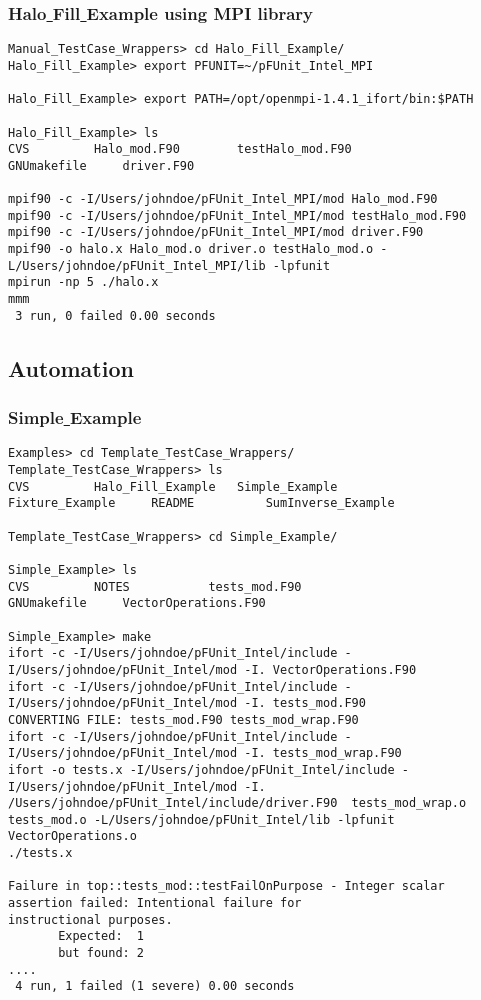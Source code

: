 \documentclass[10pt]{article}
\begin{document}
\subsubsection{Halo\underline{ }Fill\underline{ }Example using MPI library}

{\small \begin{verbatim}
Manual_TestCase_Wrappers> cd Halo_Fill_Example/
Halo_Fill_Example> export PFUNIT=~/pFUnit_Intel_MPI

Halo_Fill_Example> export PATH=/opt/openmpi-1.4.1_ifort/bin:$PATH

Halo_Fill_Example> ls
CVS			Halo_mod.F90		testHalo_mod.F90
GNUmakefile		driver.F90

mpif90 -c -I/Users/johndoe/pFUnit_Intel_MPI/mod Halo_mod.F90
mpif90 -c -I/Users/johndoe/pFUnit_Intel_MPI/mod testHalo_mod.F90
mpif90 -c -I/Users/johndoe/pFUnit_Intel_MPI/mod driver.F90
mpif90 -o halo.x Halo_mod.o driver.o testHalo_mod.o -L/Users/johndoe/pFUnit_Intel_MPI/lib -lpfunit
mpirun -np 5 ./halo.x
mmm  
 3 run, 0 failed 0.00 seconds

\end{verbatim}
}

\subsection{Automation}

\subsubsection{Simple\underline{ }Example}

{\small \begin{verbatim}
Examples> cd Template_TestCase_Wrappers/
Template_TestCase_Wrappers> ls
CVS			Halo_Fill_Example	Simple_Example
Fixture_Example		README			SumInverse_Example

Template_TestCase_Wrappers> cd Simple_Example/

Simple_Example> ls
CVS			NOTES			tests_mod.F90
GNUmakefile		VectorOperations.F90

Simple_Example> make
ifort -c -I/Users/johndoe/pFUnit_Intel/include -I/Users/johndoe/pFUnit_Intel/mod -I. VectorOperations.F90
ifort -c -I/Users/johndoe/pFUnit_Intel/include -I/Users/johndoe/pFUnit_Intel/mod -I. tests_mod.F90
CONVERTING FILE: tests_mod.F90 tests_mod_wrap.F90
ifort -c -I/Users/johndoe/pFUnit_Intel/include -I/Users/johndoe/pFUnit_Intel/mod -I. tests_mod_wrap.F90
ifort -o tests.x -I/Users/johndoe/pFUnit_Intel/include -I/Users/johndoe/pFUnit_Intel/mod -I. /Users/johndoe/pFUnit_Intel/include/driver.F90  tests_mod_wrap.o  tests_mod.o -L/Users/johndoe/pFUnit_Intel/lib -lpfunit VectorOperations.o
./tests.x     
  
Failure in top::tests_mod::testFailOnPurpose - Integer scalar assertion failed: Intentional failure for 
instructional purposes.
       Expected:  1
       but found: 2
....
 4 run, 1 failed (1 severe) 0.00 seconds
\end{verbatim}
}
\end{document}

